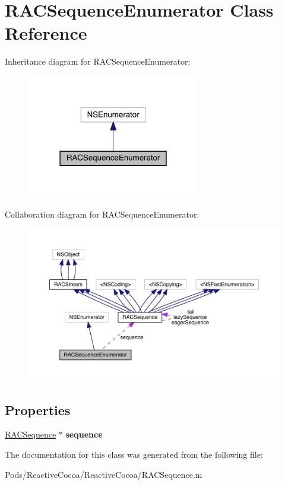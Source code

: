 \hypertarget{interface_r_a_c_sequence_enumerator}{}\section{R\+A\+C\+Sequence\+Enumerator Class Reference}
\label{interface_r_a_c_sequence_enumerator}


Inheritance diagram for R\+A\+C\+Sequence\+Enumerator\+:\nopagebreak
\begin{figure}[H]
\begin{center}
\leavevmode
\includegraphics[width=214pt]{interface_r_a_c_sequence_enumerator__inherit__graph}
\end{center}
\end{figure}


Collaboration diagram for R\+A\+C\+Sequence\+Enumerator\+:\nopagebreak
\begin{figure}[H]
\begin{center}
\leavevmode
\includegraphics[width=350pt]{interface_r_a_c_sequence_enumerator__coll__graph}
\end{center}
\end{figure}
\subsection*{Properties}
\begin{DoxyCompactItemize}
\item 
\mbox{\label{interface_r_a_c_sequence_enumerator_a7db86e444ec52cc12875006212fcefdc}} 
\mbox{\hyperlink{interface_r_a_c_sequence}{R\+A\+C\+Sequence}} $\ast$ {\bfseries sequence}
\end{DoxyCompactItemize}


The documentation for this class was generated from the following file\+:\begin{DoxyCompactItemize}
\item 
Pods/\+Reactive\+Cocoa/\+Reactive\+Cocoa/R\+A\+C\+Sequence.\+m\end{DoxyCompactItemize}

